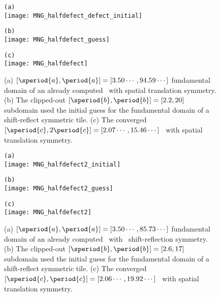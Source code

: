 \begin{description}
{\begin{figure}
\begin{minipage}[height=.4\textheight]{.5\textwidth}
\centering \small{\texttt{(a)}}\\
\texttt{[image: MNG\_halfdefect\_defect\_initial]}
\end{minipage}
\begin{minipage}[height=.4\textheight]{.5\textwidth}
\centering \small{\texttt{(b)}}\\
\texttt{[image: MNG\_halfdefect\_guess]}
\end{minipage}
\begin{minipage}[height=.1\textheight]{\textwidth}
\centering \small{\texttt{(c)}}\\
\texttt{[image: MNG\_halfdefect]}
\end{minipage}
\caption{ \label{fig:halfdefect}
(a)
$[\speriod{a},\period{a}]=[3.50\cdots,94.59\cdots]$ fundamental domain
of an already computed \twot\ with spatial translation symmetry.
(b)
The clipped-out $[\speriod{b},\period{b}]=[2.2,20]$ subdomain used the
initial guess for the fundamental domain of a shift-reflect symmetric tile.
(c)
The converged $[\speriod{c},2\period{c}]=[2.07\cdots,15.46\cdots]$ \twot\
with spatial translation symmetry.
}
\end{figure}

\begin{figure}
\begin{minipage}[height=.4\textheight]{.5\textwidth}
\centering \small{\texttt{(a)}}\\
\texttt{[image: MNG\_halfdefect2\_initial]}
\end{minipage}
\begin{minipage}[height=.4\textheight]{.5\textwidth}
\centering \small{\texttt{(b)}}\\
\texttt{[image: MNG\_halfdefect2\_guess]}
\end{minipage}
\begin{minipage}[height=.1\textheight]{\textwidth}
\centering \small{\texttt{(c)}}\\
\texttt{[image: MNG\_halfdefect2]}
\end{minipage}
\caption{ \label{fig:halfdefect2}
(a)
$[\speriod{a},\period{a}]=[3.50\cdots,85.73\cdots]$ fundamental domain
of an already computed \twot\ with \spt\ shift-reflection symmetry.
(b)
The clipped-out $[\speriod{b},\period{b}]=[2.6,17]$ subdomain used the
initial guess for the fundamental domain of a shift-reflect symmetric tile.
(c)
The converged $[\speriod{c},\period{c}]=[2.06\cdots,19.92\cdots]$ \twot\
with spatial translation symmetry.
}
\end{figure}

}
\end{description}
